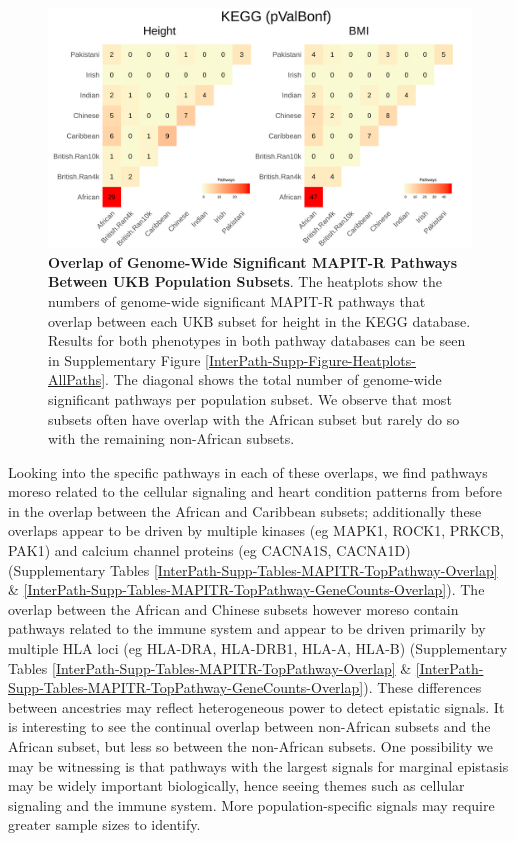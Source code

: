 \documentclass[12pt,a4paper]{article}
\begin{document}
\begin{figure}[htb]
\centering
\includegraphics[scale=.225]{Images/Main/InterPath_Main_Figure_Heatplots_KEGG_vs1.png}
\caption[TBD]{\textbf{Overlap of Genome-Wide Significant MAPIT-R Pathways Between UKB Population Subsets}. The heatplots show the numbers of genome-wide significant MAPIT-R pathways that overlap between each UKB subset for height in the KEGG database. Results for both phenotypes in both pathway databases can be seen in Supplementary Figure \ref{InterPath-Supp-Figure-Heatplots-AllPaths}. The diagonal shows the total number of genome-wide significant pathways per population subset. We observe that most subsets often have overlap with the African subset but rarely do so with the remaining non-African subsets.}
\label{InterPath-Main-Figure-Heatplots-KEGG}
\end{figure}

Looking into the specific pathways in each of these overlaps, we find pathways moreso related to the cellular signaling and heart condition patterns from before in the overlap between the African and Caribbean subsets; additionally these overlaps appear to be driven by multiple kinases (eg MAPK1, ROCK1, PRKCB, PAK1) and calcium channel proteins (eg CACNA1S, CACNA1D) (Supplementary Tables \ref{InterPath-Supp-Tables-MAPITR-TopPathway-Overlap} \& \ref{InterPath-Supp-Tables-MAPITR-TopPathway-GeneCounts-Overlap}). The overlap between the African and Chinese subsets however moreso contain pathways related to the immune system and appear to be driven primarily by multiple HLA loci (eg HLA-DRA, HLA-DRB1, HLA-A, HLA-B) (Supplementary Tables \ref{InterPath-Supp-Tables-MAPITR-TopPathway-Overlap} \& \ref{InterPath-Supp-Tables-MAPITR-TopPathway-GeneCounts-Overlap}). These differences between ancestries may reflect heterogeneous power to detect epistatic signals. It is interesting to see the continual overlap between non-African subsets and the African subset, but less so between the non-African subsets. One possibility we may be witnessing is that pathways with the largest signals for marginal epistasis may be widely important biologically, hence seeing themes such as cellular signaling and the immune system. More population-specific signals may require greater sample sizes to identify. 
\end{document}
